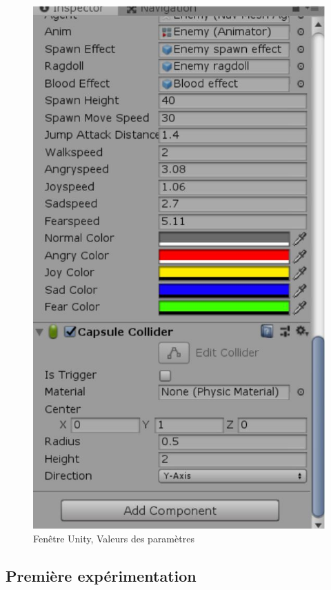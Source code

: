 \begin{figure}[th]
\centering
\includegraphics{Figures/751unity.JPG}
\decoRule
\caption[Fenêtre Unity, Valeurs des paramètres]{Fenêtre Unity, Valeurs des paramètres}
\label{fig:751u}
\end{figure}


\subsection{Première expérimentation}

